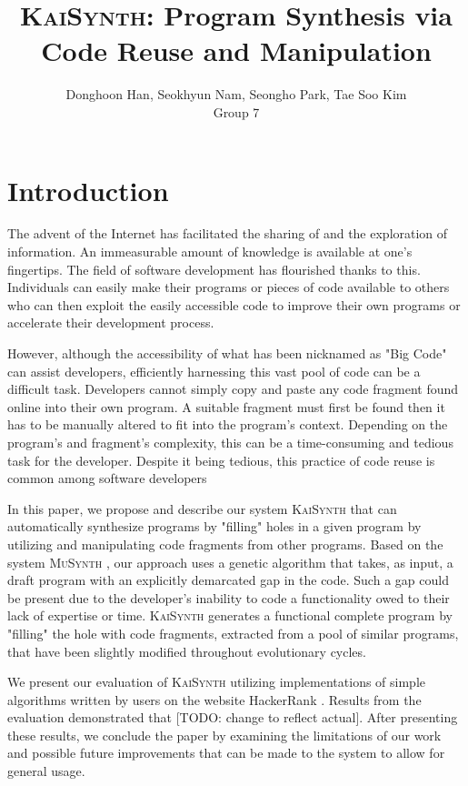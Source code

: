 \documentclass{article}
\title{\textsc{KaiSynth}: Program Synthesis via Code Reuse and Manipulation}
\author{Donghoon Han, Seokhyun Nam, Seongho Park, Tae Soo Kim\\Group 7}
\begin{document}
\maketitle

\section{Introduction}
The advent of the Internet has facilitated the sharing of and the exploration of information. An immeasurable amount of knowledge is available at one's fingertips. The field of software development has flourished thanks to this. Individuals can easily make their programs or pieces of code available to others who can then exploit the easily accessible code to improve their own programs or accelerate their development process.

However, although the accessibility of what has been nicknamed as "Big Code" can assist developers, efficiently harnessing this vast pool of code can be a difficult task. Developers cannot simply copy and paste any code fragment found online into their own program. A suitable fragment must first be found then it has to be manually altered to fit into the program's context. Depending on the program's and fragment's complexity, this can be a time-consuming and tedious task for the developer. Despite it being tedious, this practice of code reuse is common among software developers 

In this paper, we propose and describe our system \textsc{KaiSynth} that can automatically synthesize programs by "filling" holes in a given program by utilizing and manipulating code fragments from other programs. Based on the system \textsc{MuSynth} \cite{musynth}, our approach uses a genetic algorithm that takes, as input, a draft program with an explicitly demarcated gap in the code. Such a gap could be present due to the developer's inability to code a functionality owed to their lack of expertise or time. \textsc{KaiSynth} generates a functional complete program by "filling" the hole with code fragments, extracted from a pool of similar programs, that have been slightly modified throughout evolutionary cycles. 

We present our evaluation of \textsc{KaiSynth} utilizing implementations of simple algorithms written by users on the website HackerRank \cite{hackerrank}. Results from the evaluation demonstrated that [TODO: change to reflect actual]. After presenting these results, we conclude the paper by examining the limitations of our work and possible future improvements that can be made to the system to allow for general usage.
\end{document}
